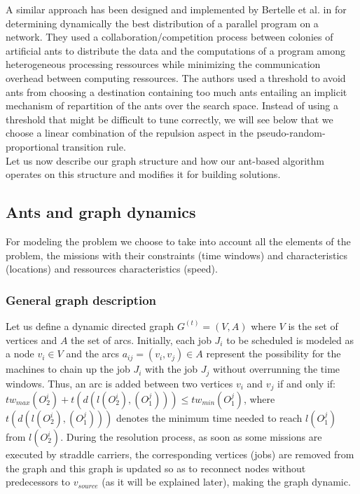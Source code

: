 \documentclass[a4paper,10pt]{article}
\begin{document}
A similar approach has been designed and implemented by Bertelle et al. in \cite{Bertelle2006,Bertelle2007} for determining dynamically the best distribution of a parallel program on a network. They used a collaboration/competition process between colonies of artificial ants to distribute the data and the computations of a program among heterogeneous processing ressources while minimizing the communication overhead between computing ressources. The authors used a threshold to avoid ants from choosing a destination containing too much ants entailing an implicit mechanism of repartition of the ants over the search space. Instead of using a threshold that might be difficult to tune correctly, we will see below that we choose a linear combination of the repulsion aspect in the pseudo-random-proportional transition rule.\\

Let us now describe our graph structure and how our ant-based algorithm operates on this structure and modifies it for building solutions.

\subsection{Ants and graph dynamics}

For modeling the problem we choose to take into account all the elements of the problem, the missions with their constraints (time windows) and characteristics (locations) and ressources characteristics (speed).
 
\subsubsection{General graph description} 

Let us define a dynamic directed graph $G^{(t)} = (V,A)$ where $V$ is the set of vertices and $A$ the set of arcs. Initially, each job $J_i$ to be scheduled is modeled as a node $v_i \in V$ and the arcs $a_{ij} = (v_i,v_j) \in A$ represent the possibility for the machines to chain up the job $J_i$ with the job $J_j$ without overrunning the time windows. Thus, an arc is added between two vertices $v_i$ and $v_j$ if and only if:  $tw_{max}(O_2^i) + t(d(l(O_2^i),(O_1^j))) \leq tw_{min}(O_1^j)$, where $t(d(l(O_2^i),(O_1^j)))$ denotes the minimum time needed to reach $l(O_1^j)$ from $l(O_2^i)$. During the resolution process, as soon as some missions are executed by straddle carriers, the corresponding vertices (jobs) are removed from the graph and this graph is updated so as to reconnect nodes without predecessors to $v_{source}$ (as it will be explained later), making the graph dynamic.
\end{document}
